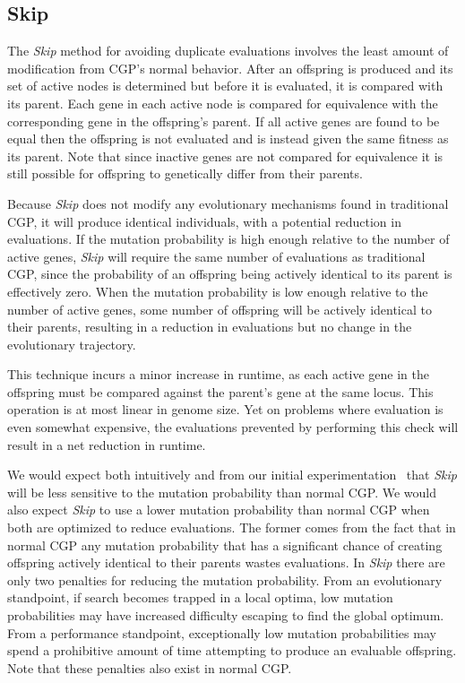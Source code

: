 \documentclass[journal]{IEEEtran}
\begin{document}
\subsection{Skip}
The \emph{Skip} method for avoiding duplicate evaluations involves the least
amount of modification from CGP's normal behavior.  After an offspring is produced
and its set of active nodes is determined but before it is evaluated, it is compared
with its parent.  Each gene in each active node is compared for equivalence with
the corresponding gene in the offspring's parent.  If all active genes are found to be equal
then the offspring is not evaluated and is instead given the same fitness
as its parent.
Note that since inactive genes are not compared for equivalence it is still possible
for offspring to genetically differ from their parents.

Because \emph{Skip} does not modify any evolutionary mechanisms found in traditional CGP,
it will produce identical individuals, with a potential reduction in evaluations.
If the mutation probability is high enough relative
to the number of active genes, \emph{Skip} will require the same number of evaluations as traditional CGP, since
the probability of an offspring being actively identical to its parent is effectively zero.
When the mutation probability is low enough relative to the number of active genes, some number of
offspring will be actively identical to their parents, resulting in a reduction in evaluations
but no change in the evolutionary trajectory.

This technique incurs a minor increase in runtime, as each active gene in the
offspring must be compared against the parent's gene at the same locus.
This operation is at most linear in genome size.  Yet
on problems where evaluation is even somewhat expensive, the evaluations prevented
by performing this check will result in a net reduction in runtime.

We would expect both intuitively and from our initial
experimentation~\cite{goldman:2013:cgpwaste} that \emph{Skip} will be less sensitive
to the mutation probability than normal CGP.  We would also expect \emph{Skip} to use a lower
mutation probability than normal CGP when both are optimized to reduce evaluations.
The former comes from the fact that in normal CGP any mutation probability that has a significant
chance of creating offspring actively identical to their parents wastes
evaluations.  In \emph{Skip} there are only two penalties for reducing the
mutation probability.  From an evolutionary standpoint, if search becomes trapped in a local optima, low mutation
probabilities may have increased difficulty escaping to find the global optimum.  From a performance standpoint,
exceptionally low mutation probabilities may spend a prohibitive amount of time
attempting to produce an evaluable offspring.
Note that these penalties also exist in normal CGP.
\end{document}
